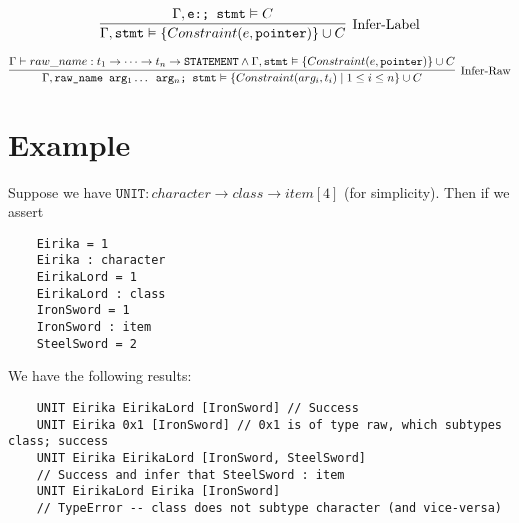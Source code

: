\documentclass[10pt,a4paper]{article}
\begin{document}
$$
\infer[\text{Infer-Label}]
{\Gamma, \texttt{stmt} \vDash \{Constraint(e, \texttt{pointer})\} \cup C}
{\Gamma, \texttt{e:; stmt} \vDash C}
$$

$$
\infer[\text{Infer-Raw}]
{\Gamma, \texttt{raw\_name arg$_1 \dots$ arg$_n$; stmt} \vDash \{Constraint(arg_i, t_i) \mid 1 \leq i \leq n\} \cup C}
{\Gamma \vdash raw\_name : t_1 \rightarrow \dots \rightarrow t_n \rightarrow \texttt{STATEMENT} \wedge \Gamma, \texttt{stmt} \vDash \{Constraint(e, \texttt{pointer})\} \cup C}
$$

\newpage

\section{Example}
Suppose we have $\texttt{UNIT} : character \rightarrow class \rightarrow item[4]$ (for simplicity). Then if we assert 
\begin{verbatim}
	Eirika = 1
	Eirika : character
	EirikaLord = 1
	EirikaLord : class
	IronSword = 1
	IronSword : item
	SteelSword = 2
\end{verbatim}
We have the following results:
\begin{verbatim}
	UNIT Eirika EirikaLord [IronSword] // Success
	UNIT Eirika 0x1 [IronSword] // 0x1 is of type raw, which subtypes class; success
	UNIT Eirika EirikaLord [IronSword, SteelSword] 
	// Success and infer that SteelSword : item
	UNIT EirikaLord Eirika [IronSword] 
	// TypeError -- class does not subtype character (and vice-versa)
\end{verbatim}
\end{document}

